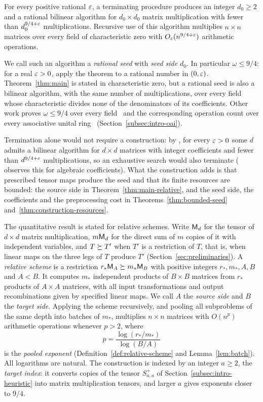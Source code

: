 \begin{theorem}\label{thm:main}
For every positive rational \(\varepsilon\), a terminating procedure produces
an integer \(d_0\ge2\) and a rational bilinear algorithm for
\(d_0\times d_0\) matrix multiplication with fewer than
\(d_0^{9/4+\varepsilon}\) multiplications. Recursive use of this algorithm
multiplies \(n\times n\) matrices over every field of characteristic
zero with \(O_\varepsilon(n^{9/4+\varepsilon})\) arithmetic operations.
\end{theorem}

We call such an algorithm a \emph{rational seed} with \emph{seed side}
\(d_0\). In particular \(\omega\le9/4\): for a real \(\varepsilon>0\), apply the
theorem to a rational number in \((0,\varepsilon)\). Theorem~\ref{thm:main} is
stated in characteristic zero, but a rational seed is also a bilinear
algorithm, with the same number of multiplications, over every field
whose characteristic divides none of the denominators of its
coefficients. Other work proves
\(\omega\le9/4\) over every field~\citep{Nav26a,Zui26,Fil26} and the
corresponding operation count over every associative unital
ring~\citep{Nav26b} (Section~\ref{subsec:intro-oai}).

Termination alone
would not require a construction: by \citet{Nav26b}, for every
\(\varepsilon>0\) some \(d\) admits a bilinear algorithm for \(d\times d\)
matrices with integer coefficients and fewer than \(d^{9/4+\varepsilon}\)
multiplications, so an exhaustive search would also terminate (\citet[Remark~5.2]{OAI26} observes this for
algebraic coefficients). What the construction adds is that
prescribed tensor maps produce the seed and that its finite resources
are bounded: the source side in Theorem~\ref{thm:main-relative}, and the
seed side, the coefficients and the preprocessing cost in
Theorems~\ref{thm:bounded-seed} and~\ref{thm:construction-resources}.

The quantitative result is stated for relative schemes. Write \(\mathsf M_d\)
for the tensor of \(d\times d\) matrix multiplication, \(m\mathsf M_d\) for the
direct sum of \(m\) copies of it with independent variables, and
\(T\succeq T'\) when \(T'\) is a restriction of \(T\), that is, when
linear maps on the three legs of \(T\) produce \(T'\)
(Section~\ref{sec:preliminaries}). A \emph{relative scheme} is a
restriction \(r_*\mathsf M_A\succeq m_*\mathsf M_B\) with positive integers
\(r_*,m_*,A,B\) and \(A<B\). It computes \(m_*\) independent
products of \(B\times B\) matrices from \(r_*\) products of
\(A\times A\) matrices, with all input transformations and output
recombinations given by specified linear maps. We call \(A\) the
\emph{source side} and \(B\) the \emph{target side}. Applying the scheme
recursively, and pooling all subproblems of the same depth into batches
of \(m_*\), multiplies \(n\times n\) matrices with \(O(n^p)\) arithmetic
operations whenever \(p>2\), where
\[
 p=\frac{\log(r_*/m_*)}{\log(B/A)}
\]
is the \emph{pooled exponent} (Definition~\ref{def:relative-scheme} and
Lemma~\ref{lem:batch}). All logarithms are natural. The construction is
indexed by an integer \(a\ge2\), the \emph{target index}: it converts
copies of the tensor \(S^+_{a,a}\) of
Section~\ref{subsec:intro-heuristic} into matrix multiplication tensors,
and larger \(a\) gives exponents closer to \(9/4\).

